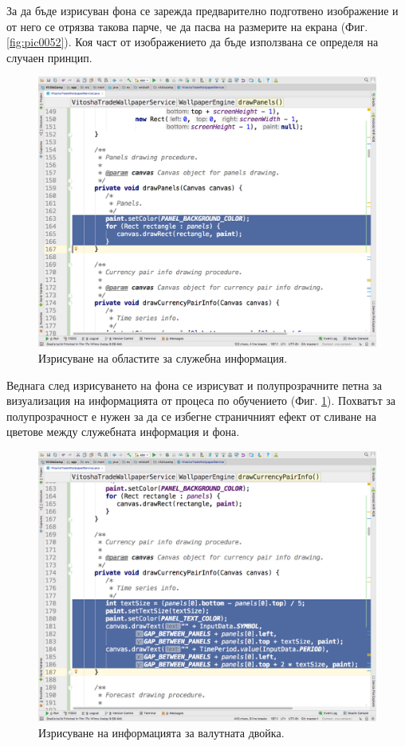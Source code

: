\documentclass[book,14pt,oneside,openany]{memoir}
\begin{document}
За да бъде изрисуван фона се зарежда предварително подготвено изображение и от него се отрязва такова парче, че да пасва на размерите на екрана (Фиг. \ref{fig:pic0052}). Коя част от изображението да бъде използвана се определя на случаен принцип.

\begin{figure}[h]
  \centering
  \includegraphics[height=0.45\pdfpageheight]{./images/pic0053.png}
  \caption{Изрисуване на областите за служебна информация.}
\label{fig:pic0053}
\end{figure}
\FloatBarrier

Веднага след изрисуването на фона се изрисуват и полупрозрачните петна за визуализация на информацията от процеса по обучението (Фиг. \ref{fig:pic0053}). Похватът за полупрозрачност е нужен за да се избегне страничният ефект от сливане на цветове между служебната информация и фона. 

\begin{figure}[h]
  \centering
  \includegraphics[height=0.45\pdfpageheight]{./images/pic0054.png}
  \caption{Изрисуване на информацията за валутната двойка.}
\label{fig:pic0054}
\end{figure}
\FloatBarrier
\end{document}
